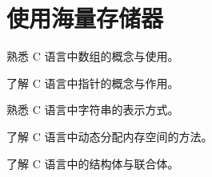 
\chapter{使用海量存储器}

\begin{introduction}
	\item 熟悉 C 语言中数组的概念与使用。
	\item 了解 C 语言中指针的概念与作用。
	\item 熟悉 C 语言中字符串的表示方式。
	\item 了解 C 语言中动态分配内存空间的方法。
	\item 了解 C 语言中的结构体与联合体。
\end{introduction}
